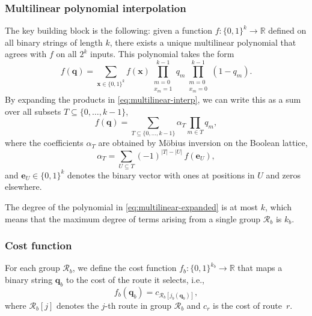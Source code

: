 \documentclass{article}
\begin{document}
\subsubsection{Multilinear polynomial interpolation}
The key building block is the following: given a function $f: \{0,1\}^k \to \mathbb{R}$ defined on all binary strings of length $k$, there exists a unique multilinear polynomial that agrees with $f$ on all $2^k$ inputs. This polynomial takes the form
\begin{equation}
    f(\mathbf{q}) = \sum_{\mathbf{x} \in \{0,1\}^{k}} f(\mathbf{x}) \prod_{\substack{m=0 \\ x_m = 1}}^{k-1} q_m \prod_{\substack{m=0 \\ x_m = 0}}^{k-1} (1 - q_m).
    \label{eq:multilinear-interp}
\end{equation}
By expanding the products in \eqref{eq:multilinear-interp}, we can write this as a sum over all subsets $T \subseteq \{0, \ldots, k-1\}$,
\begin{equation}
    f(\mathbf{q}) = \sum_{T \subseteq \{0, \ldots, k-1\}} \alpha_T \prod_{m \in T} q_m,
    \label{eq:multilinear-expanded}
\end{equation}
where the coefficients $\alpha_T$ are obtained by M\"obius inversion on the Boolean lattice,
\begin{equation}
    \alpha_T = \sum_{U \subseteq T} (-1)^{|T| - |U|} \, f(\mathbf{e}_U),
    \label{eq:mobius-inversion}
\end{equation}
and $\mathbf{e}_U \in \{0,1\}^k$ denotes the binary vector with ones at positions in $U$ and zeros elsewhere.

The degree of the polynomial in \eqref{eq:multilinear-expanded} is at most $k$, which means that the maximum degree of terms arising from a single group $\mathcal{R}_b$ is $k_b$.

\subsubsection{Cost function}
For each group $\mathcal{R}_b$, we define the cost function $f_b : \{0,1\}^{k_b} \to \mathbb{R}$ that maps a binary string $\mathbf{q}_b$ to the cost of the route it selects, i.e.,
\begin{equation}
    f_b(\mathbf{q}_b) = c_{\mathcal{R}_b[j_b(\mathbf{q}_b)]},
    \label{eq:bucket-cost-function}
\end{equation}
where $\mathcal{R}_b[j]$ denotes the $j$-th route in group $\mathcal{R}_b$ and $c_r$ is the cost of route~$r$.
\end{document}
